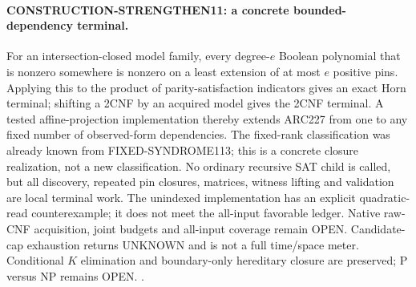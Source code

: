 \paragraph{CONSTRUCTION-STRENGTHEN11: a concrete bounded-dependency terminal.}
For an intersection-closed model family, every degree-$e$ Boolean polynomial
that is nonzero somewhere is nonzero on a least extension of at most $e$
positive pins. Applying this to the product of parity-satisfaction indicators
gives an exact Horn terminal; shifting a 2CNF by an acquired model gives the
2CNF terminal. A tested affine-projection implementation thereby extends
ARC227 from one to any fixed number of observed-form dependencies.
The fixed-rank classification was already known from FIXED-SYNDROME113;
this is a concrete closure realization, not a new classification.
No ordinary recursive SAT child is called, but all discovery, repeated pin
closures, matrices, witness lifting and validation are local terminal work.
The unindexed implementation has an explicit quadratic-read counterexample;
it does not meet the all-input favorable ledger. Native raw-CNF acquisition,
joint budgets and all-input coverage remain OPEN. Candidate-cap exhaustion
returns UNKNOWN and is not a full time/space meter. Conditional $K$ elimination
and boundary-only hereditary closure are preserved; P versus NP remains OPEN.
.
